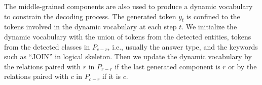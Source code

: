 
The middle-grained components are also used to produce a dynamic vocabulary to constrain the decoding process.
The generated token $y_t$ is confined to the tokens involved in the dynamic vocabulary at each step $t$.
We initialize the dynamic vocabulary with the union of tokens from the detected entities, tokens from the detected classes in $P_{c-r}$, i.e., usually the answer type, and the keywords such as ``JOIN'' in logical skeleton.
Then we update the dynamic vocabulary by the relations paired with $r$ in $P_{r-r}$ if the last generated component is $r$ or by the relations paired with $c$ in $P_{c-r}$ if it is $c$.


   